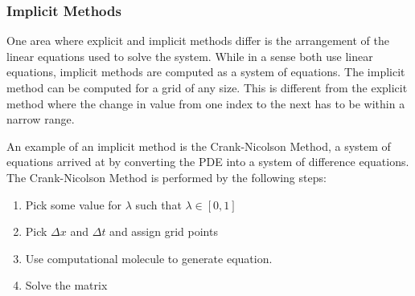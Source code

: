 	



\subsubsection{Implicit Methods}

One area where explicit and implicit methods differ is the arrangement of the linear equations used to solve the system.  %
While in a sense both use linear equations, implicit methods are computed as a system of equations. %
The implicit method can be computed for a grid of any size.  This is different from the explicit method where the change in value from one index to the next has to be within a narrow range.  

An example of an implicit method is the Crank-Nicolson Method,  a %
system of equations arrived at by converting the PDE into a system of difference equations. The Crank-Nicolson Method is performed by the following steps:
\begin{enumerate}
\item Pick some value for $\lambda$ such that $\lambda \in [0,1] $
\item Pick $\Delta x$ and $\Delta t$ and assign grid points
\item Use computational molecule to generate equation.
\item Solve the matrix
\end{enumerate}



